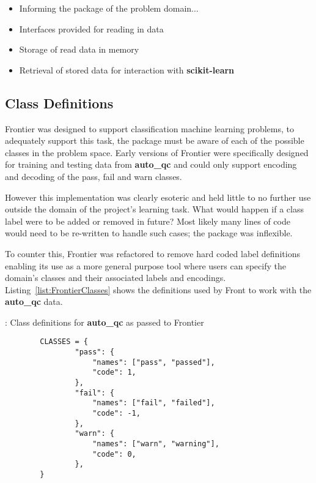 \begin{itemize}
    \item Informing the package of the problem domain...
    \item Interfaces provided for reading in data
    \item Storage of read data in memory
    \item Retrieval of stored data for interaction with \textbf{scikit-learn}
\end{itemize}


\subsection{Class Definitions}
\label{chap:classes}

Frontier was designed to support classification machine learning problems, to
adequately support this task, the package must be aware of each of the possible
classes in the problem space. Early versions of Frontier were specifically
designed for training and testing data from \textbf{auto\_qc} and could only
support encoding and decoding of the pass, fail and warn classes.

However this implementation was clearly esoteric and held little to no further
use outside the domain of the project's learning task. What would happen if a
class label were to be added or removed in future? Most likely many lines of
code would need to be re-written to handle such cases; the package was
inflexible.

To counter this, Frontier was refactored to remove hard coded label definitions
enabling its use as a more general purpose tool where users can specify the
domain's classes and their associated labels and encodings.
Listing~\ref{list:FrontierClasses} shows the definitions used by Front to work
with the \textbf{auto\_qc} data.

\begin{listing}[H]
    \caption[FrontierClasses]{: Class definitions for \textbf{auto\_qc} as passed to Frontier}
    \label{list:FrontierClasses}
    \begin{verbatim}
        CLASSES = {
                "pass": {
                    "names": ["pass", "passed"],
                    "code": 1,
                },
                "fail": {
                    "names": ["fail", "failed"],
                    "code": -1,
                },
                "warn": {
                    "names": ["warn", "warning"],
                    "code": 0,
                },
        }
    \end{verbatim}
\end{listing}

